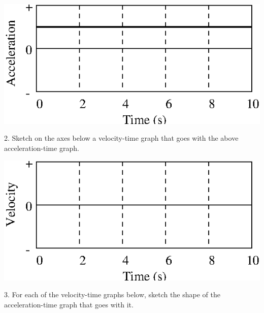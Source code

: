 \vspace{0.3cm}
{\par\raggedright \includegraphics{changing_fig6.eps} \par}
\vspace{1.3cm}

2. Sketch on the axes below a velocity-time graph that goes with the above acceleration-time
graph.

\vspace{0.3cm}
{\par\centering \includegraphics{changing_fig7.eps} \par}
\vspace{1.3cm}

3. For each of the velocity-time graphs below, sketch the shape of the acceleration-time
graph that goes with it.

